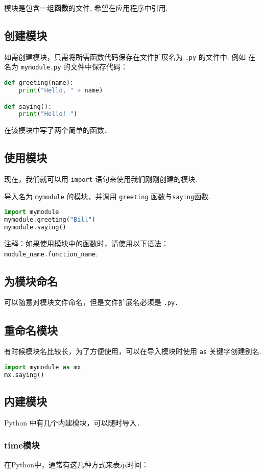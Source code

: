 
模块是包含一组\textbf{函数}的文件, 希望在应用程序中引用.
\subsection{创建模块}
如需创建模块，只需将所需函数代码保存在文件扩展名为 \verb|.py| 的文件中. 例如
在名为 \verb|mymodule.py| 的文件中保存代码：
\begin{lstlisting}[language=python]
def greeting(name):
    print("Hello, " + name)

def saying():
    print("Hello! ")
\end{lstlisting}
在该模块中写了两个简单的函数．

\subsection{使用模块}
现在，我们就可以用 \verb|import| 语句来使用我们刚刚创建的模块.

导入名为 \verb|mymodule| 的模块，并调用 \verb|greeting| 函数与\verb|saying|函数.
\begin{lstlisting}[language=python]
import mymodule
mymodule.greeting("Bill")
mymodule.saying()
\end{lstlisting}
注释：如果使用模块中的函数时，请使用以下语法：\verb|module_name.function_name|.

\subsection{为模块命名}
可以随意对模块文件命名，但是文件扩展名必须是 \verb|.py|．

\subsection{重命名模块}
有时候模块名比较长，为了方便使用，可以在导入模块时使用 \verb|as| 关键字创建别名.
\begin{lstlisting}[language=python]
import mymodule as mx
mx.saying()
\end{lstlisting}

\subsection{内建模块}
Python 中有几个内建模块，可以随时导入．
\subsubsection{time模块}
在Python中，通常有这几种方式来表示时间：

